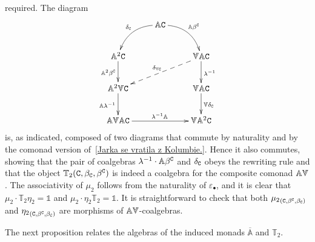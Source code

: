 \documentclass[12pt,leqno]{amsart}
\theoremstyle{definition}
\def\T{\mathbb{T}}
\def\Ar{\mathbb{A}}
\def\id{{\mathbb 1}}
\newcommand{\C}{{\tt C}}
\newcommand{\4}{\texttt{4}}
\newcommand{\oAr}{\overline{\Ar}}
\newcommand{\Vr}{\text{\raisebox{\depth}{\scalebox{1}[-1]{$\Ar$}}}}
\renewcommand{\epsilon}{\varepsilon}
\let\epf\endproof
\begin{document}
required.
The diagram
\[
\xymatrix{
&\Ar\C \ar@/_1.3em/[ld]_{\delta_\C} \ar@/^1.3em/[rd]^{\Ar\beta^\C}
\\
\Ar^2 \C  \ar[d]_{\Ar^2 \beta^\C} && \Vr\Ar\C \ar[d]^{\lambda^{-1}}
\ar@{-->}[lld]_{\delta_{\Vr\C}}
\\
\Ar^2\Vr\C \ar[d]_{\Ar \lambda^{-1}}  && \Vr\Ar\C \ar[d]^{\Vr \delta_\C}
\\
\Ar\Vr\Ar\C\ar[rr]^{\lambda^{-1}\Ar} && \Vr\Ar^2 \C 
}
\]
is, as indicated, composed of two diagrams that commute by naturality and by the comonad version of~\eqref{Jarka se vratila z
  Kolumbie.}. Hence it 
also commutes, showing that the pair of coalgebras 
$\lambda^{-1}\cdot \Ar\beta^\C$ and
$\delta_\C$  obeys the rewriting rule and that the object
$\T_2(\C,\beta_\C,\beta^\C)$ is indeed a coalgebra for the composite
comonad $\Ar\Vr$.  The associativity of $\mu_2$ follows from the
naturality of $\epsilon_\bullet$, and it is clear that
\hbox{$\mu_2\cdot\T_2\eta_2=\id$} and $\mu_2\cdot\eta_2\T_2=\id$.  It is
straightforward to check that both ${\mu_2}_{(\C,\beta^\C,\beta_\C)}$
and ${\eta_2}_{(\C,\beta^\C,\beta_\C)}$ are morphisms of
$\Ar\Vr$-coalgebras.  \epf 

The next proposition relates the algebras
of the induced monads $\oAr$ and $\T_2$.
\end{document}
